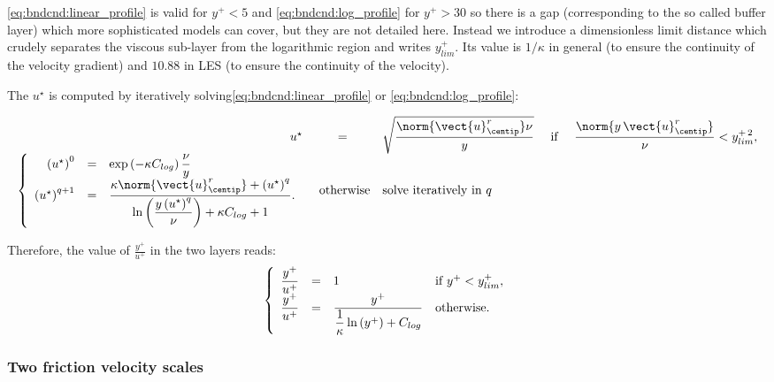 \eqref{eq:bndcnd:linear_profile} is valid for $y^+<5$ and \eqref{eq:bndcnd:log_profile} for $y^+>30$ so there is a gap (corresponding to the so called buffer
layer) which more sophisticated models can cover, but they are not detailed here. Instead we
introduce a dimensionless
 limit distance which crudely separates the viscous sub-layer from the logarithmic region and writes $y^+_{lim}$. Its value is $1/ \kappa$ in general (to ensure the continuity of the velocity gradient) and $10.88$ in LES (to ensure the continuity of the velocity).

The $u^\star$ is computed by iteratively solving\eqref{eq:bndcnd:linear_profile} or \eqref{eq:bndcnd:log_profile}:

\begin{equation}
\begin{array}{r c l c l}
u^\star &=& \sqrt{ \dfrac{\norm{ \vect{u}^r_{\centip} } \nu }{ y } } & \textrm{ if } & \dfrac{\norm{ y \, \vect{u}^r_{\centip} }}{\nu} < y^{+\, 2}_{lim}, \\
%
\left\lbrace
\begin{array}{r c l}
\left( u^\star \right)^{0} &=& \exp \left( - \kappa C_{log}\right) \dfrac{\nu}{y} \\
 \left( u^\star \right)^{q+1} &=& \dfrac{ \kappa \norm{ \vect{u}^r_{\centip} } + \left( u^\star \right) ^{q} }{ \ln \left( \dfrac{y \left( u^\star \right) ^{q} }{ \nu} \right) + \kappa C_{log} +1 }.
\end{array}
\right.
& \textrm{ otherwise}& \textrm{solve iteratively in $q$}
\end{array}
\end{equation}

Therefore, the value of $\frac{y^+}{u^+}$ in the two layers reads:
\begin{equation}\label{eq:bndcnd:ypup_1scale}
\left\lbrace
\begin{array}{r c l l}
\dfrac{y^+}{u^+} &=& 1 & \textrm{if } y^+ < y^+_{lim}, \\
\dfrac{y^+}{u^+} &=& \dfrac{y^+}{ \dfrac{1}{\kappa} \ln \left( y^+\right) + C_{log}} & \textrm{otherwise}.
\end{array}
\right.
\end{equation}

\subsubsection{Two friction velocity scales}\label{sec:bndcnd:2velocityscales}

